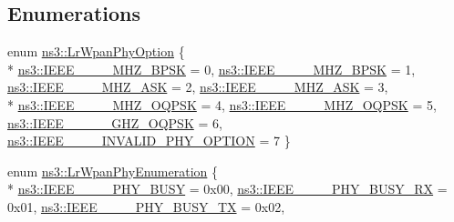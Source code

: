 \subsection*{Enumerations}
\begin{DoxyCompactItemize}
\item 
enum \hyperlink{group__lr-wpan_ga23ee18bb5f5136211c75a7f58673db52}{ns3\+::\+Lr\+Wpan\+Phy\+Option} \{ \\*
\hyperlink{group__lr-wpan_gga23ee18bb5f5136211c75a7f58673db52a329078ab3af79c38d390015641308ab1}{ns3\+::\+I\+E\+E\+E\+\_\+\_\+\_\+\_\+M\+H\+Z\+\_\+\+B\+P\+SK} = 0, 
\hyperlink{group__lr-wpan_gga23ee18bb5f5136211c75a7f58673db52ac5532615815eccfb43c45ac65299c2b2}{ns3\+::\+I\+E\+E\+E\+\_\+\_\+\_\+\_\+M\+H\+Z\+\_\+\+B\+P\+SK} = 1, 
\hyperlink{group__lr-wpan_gga23ee18bb5f5136211c75a7f58673db52a3f9c10879130204ba7d353141c7d7c12}{ns3\+::\+I\+E\+E\+E\+\_\+\_\+\_\+\_\+M\+H\+Z\+\_\+\+A\+SK} = 2, 
\hyperlink{group__lr-wpan_gga23ee18bb5f5136211c75a7f58673db52ab01eef02b699b559547952b2e787c0ad}{ns3\+::\+I\+E\+E\+E\+\_\+\_\+\_\+\_\+M\+H\+Z\+\_\+\+A\+SK} = 3, 
\\*
\hyperlink{group__lr-wpan_gga23ee18bb5f5136211c75a7f58673db52a87b268d6aacca127f908720cde057fc2}{ns3\+::\+I\+E\+E\+E\+\_\+\_\+\_\+\_\+M\+H\+Z\+\_\+\+O\+Q\+P\+SK} = 4, 
\hyperlink{group__lr-wpan_gga23ee18bb5f5136211c75a7f58673db52a393617d64e325701799ab7dfc194ec2c}{ns3\+::\+I\+E\+E\+E\+\_\+\_\+\_\+\_\+M\+H\+Z\+\_\+\+O\+Q\+P\+SK} = 5, 
\hyperlink{group__lr-wpan_gga23ee18bb5f5136211c75a7f58673db52a9be398dcb297b75dd1bdfbbc30eb80fc}{ns3\+::\+I\+E\+E\+E\+\_\+\_\+\_\+\_\+\_\+G\+H\+Z\+\_\+\+O\+Q\+P\+SK} = 6, 
\hyperlink{group__lr-wpan_gga23ee18bb5f5136211c75a7f58673db52aecbdd68205278c9970eaf3af44c42bfd}{ns3\+::\+I\+E\+E\+E\+\_\+\_\+\_\+\_\+\+I\+N\+V\+A\+L\+I\+D\+\_\+\+P\+H\+Y\+\_\+\+O\+P\+T\+I\+ON} = 7
 \}
\item 
enum \hyperlink{group__lr-wpan_ga6494269d13d45c511a07b7ccbb1de754}{ns3\+::\+Lr\+Wpan\+Phy\+Enumeration} \{ \\*
\hyperlink{group__lr-wpan_gga6494269d13d45c511a07b7ccbb1de754a14641e5190b66ec8ec3903218058dc46}{ns3\+::\+I\+E\+E\+E\+\_\+\_\+\_\+\_\+\+P\+H\+Y\+\_\+\+B\+U\+SY} = 0x00, 
\hyperlink{group__lr-wpan_gga6494269d13d45c511a07b7ccbb1de754a09f430974fda07ac7d4d483a1ce23b98}{ns3\+::\+I\+E\+E\+E\+\_\+\_\+\_\+\_\+\+P\+H\+Y\+\_\+\+B\+U\+S\+Y\+\_\+\+RX} = 0x01, 
\hyperlink{group__lr-wpan_gga6494269d13d45c511a07b7ccbb1de754a87f658959801356265b8c28a85569b15}{ns3\+::\+I\+E\+E\+E\+\_\+\_\+\_\+\_\+\+P\+H\+Y\+\_\+\+B\+U\+S\+Y\+\_\+\+TX} = 0x02, 

\end{DoxyCompactItemize}
